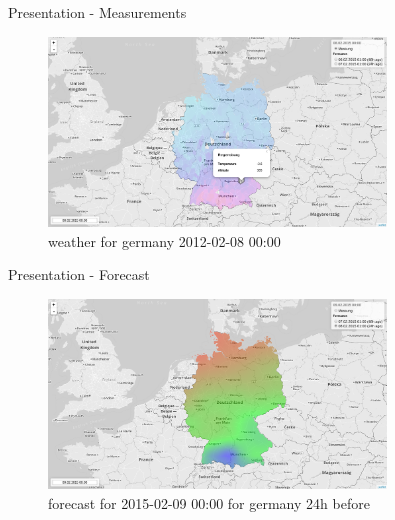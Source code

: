 \documentclass[ucs,9pt]{beamer}
\begin{document}
\begin{frame}{Presentation - Measurements}
  \begin{figure}
    \centering
    \includegraphics[width=0.8\textwidth]{images/live_measurement.png}
    \caption{weather for germany 2012-02-08 00:00}
    \label{fig:voronoi}
  \end{figure}
\end{frame}

\begin{frame}{Presentation - Forecast}
  \begin{figure}
    \centering
    \includegraphics[width=0.8\textwidth]{images/live_forecast.png}
    \caption{forecast for 2015-02-09 00:00 for germany 24h before}
    \label{fig:voronoi}
  \end{figure}
\end{frame}
\end{document}
